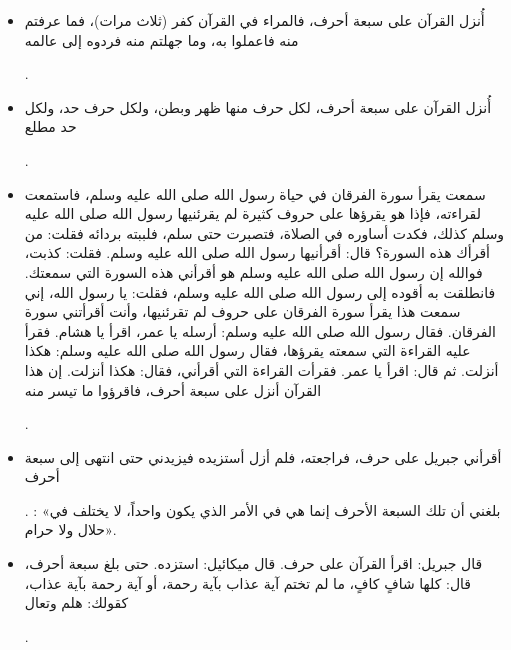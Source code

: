 \begin{itemize}
    \item {}   \begin{hadith}أُنزل القرآن على سبعة أحرف، فالمراء في القرآن كفر (ثلاث مرات)، فما عرفتم منه فاعملوا به، وما جهلتم منه فردوه إلى عالمه\end{hadith}.
    \item {}   \begin{hadith}أُنزل القرآن على سبعة أحرف، لكل حرف منها ظهر وبطن، ولكل حرف حد، ولكل حد مطلع\end{hadith}.
    \item {}   \begin{hadith}سمعت  يقرأ سورة الفرقان في حياة رسول الله صلى الله عليه وسلم، فاستمعت لقراءته، فإذا هو يقرؤها على حروف كثيرة لم يقرئنيها رسول الله صلى الله عليه وسلم كذلك، فكدت أساوره في الصلاة، فتصبرت حتى سلم، فلببته بردائه فقلت: من أقرأك هذه السورة؟ قال: أقرأنيها رسول الله صلى الله عليه وسلم. فقلت: كذبت، فوالله إن رسول الله صلى الله عليه وسلم هو أقرأني هذه السورة التي سمعتك. فانطلقت به أقوده إلى رسول الله صلى الله عليه وسلم، فقلت: يا رسول الله، إني سمعت هذا يقرأ سورة الفرقان على حروف لم تقرئنيها، وأنت أقرأتني سورة الفرقان. فقال رسول الله صلى الله عليه وسلم: أرسله يا عمر، اقرأ يا هشام. فقرأ عليه القراءة التي سمعته يقرؤها، فقال رسول الله صلى الله عليه وسلم: هكذا أنزلت. ثم قال: اقرأ يا عمر. فقرأت القراءة التي أقرأني، فقال: هكذا أنزلت. إن هذا القرآن أنزل على سبعة أحرف، فاقرؤوا ما تيسر منه\end{hadith}.
    \item {}   \begin{hadith}أقرأني جبريل على حرف، فراجعته، فلم أزل أستزيده فيزيدني حتى انتهى إلى سبعة أحرف\end{hadith}.  : «بلغني أن تلك السبعة الأحرف إنما هي في الأمر الذي يكون واحداً، لا يختلف في حلال ولا حرام».
    \item {}   \begin{hadith}قال جبريل: اقرأ القرآن على حرف. قال ميكائيل: استزده. حتى بلغ سبعة أحرف، قال: كلها شافٍ كافٍ، ما لم تختم آية عذاب بآية رحمة، أو آية رحمة بآية عذاب، كقولك: هلم وتعال\end{hadith}.
\end{itemize}


